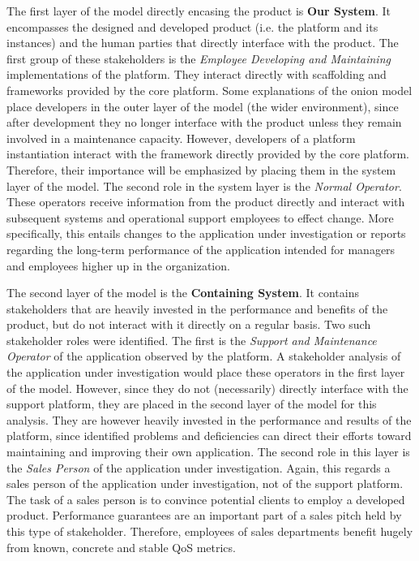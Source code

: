 The first layer of the model directly encasing the product is \textbf{Our System}. It encompasses the designed and developed product (i.e. the platform and its instances) and the human parties that directly interface with the product. The first group of these stakeholders is the \emph{Employee Developing and Maintaining} implementations of the platform. They interact directly with scaffolding and frameworks provided by the core platform. Some explanations of the onion model place developers in the outer layer of the model (the wider environment), since after development they no longer interface with the product unless they remain involved in a maintenance capacity. However, developers of a platform instantiation interact with the framework directly provided by the core platform. Therefore, their importance will be emphasized by placing them in the system layer of the model. The second role in the system layer is the \emph{Normal Operator}. These operators receive information from the product directly and interact with subsequent systems and operational support employees to effect change. More specifically, this entails changes to the application under investigation or reports regarding the long-term performance of the application intended for managers and employees higher up in the organization.

The second layer of the model is the \textbf{Containing System}. It contains stakeholders that are heavily invested in the performance and benefits of the product, but do not interact with it directly on a regular basis. Two such stakeholder roles were identified. The first is the \emph{Support and Maintenance Operator} of the application observed by the platform. A stakeholder analysis of the application under investigation would place these operators in the first layer of the model. However, since they do not (necessarily) directly interface with the support platform, they are placed in the second layer of the model for this analysis. They are however heavily invested in the performance and results of the platform, since identified problems and deficiencies can direct their efforts toward maintaining and improving their own application. The second role in this layer is the \emph{Sales Person} of the application under investigation. Again, this regards a sales person of the application under investigation, not of the support platform. The task of a sales person is to convince potential clients to employ a developed product. Performance guarantees are an important part of a sales pitch held by this type of stakeholder. Therefore, employees of sales departments benefit hugely from known, concrete and stable QoS metrics.

